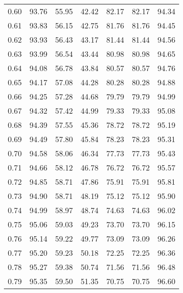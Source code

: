 \begin{tabular}{|c|c|c|c|c|c|c|}
      0.60 &     93.76 &     55.95 &      42.42 &   82.17 &      82.17 &         94.34 \\
      0.61 &     93.83 &     56.15 &      42.75 &   81.76 &      81.76 &         94.45 \\
      0.62 &     93.93 &     56.43 &      43.17 &   81.44 &      81.44 &         94.56 \\
      0.63 &     93.99 &     56.54 &      43.44 &   80.98 &      80.98 &         94.65 \\
      0.64 &     94.08 &     56.78 &      43.84 &   80.57 &      80.57 &         94.76 \\
      0.65 &     94.17 &     57.08 &      44.28 &   80.28 &      80.28 &         94.88 \\
      0.66 &     94.25 &     57.28 &      44.68 &   79.79 &      79.79 &         94.99 \\
      0.67 &     94.32 &     57.42 &      44.99 &   79.33 &      79.33 &         95.08 \\
      0.68 &     94.39 &     57.55 &      45.36 &   78.72 &      78.72 &         95.19 \\
      0.69 &     94.49 &     57.80 &      45.84 &   78.23 &      78.23 &         95.31 \\
      0.70 &     94.58 &     58.06 &      46.34 &   77.73 &      77.73 &         95.43 \\
      0.71 &     94.66 &     58.12 &      46.78 &   76.72 &      76.72 &         95.57 \\
      0.72 &     94.85 &     58.71 &      47.86 &   75.91 &      75.91 &         95.81 \\
      0.73 &     94.90 &     58.71 &      48.19 &   75.12 &      75.12 &         95.90 \\
      0.74 &     94.99 &     58.97 &      48.74 &   74.63 &      74.63 &         96.02 \\
      0.75 &     95.06 &     59.03 &      49.23 &   73.70 &      73.70 &         96.15 \\
      0.76 &     95.14 &     59.22 &      49.77 &   73.09 &      73.09 &         96.26 \\
      0.77 &     95.20 &     59.23 &      50.18 &   72.25 &      72.25 &         96.36 \\
      0.78 &     95.27 &     59.38 &      50.74 &   71.56 &      71.56 &         96.48 \\
      0.79 &     95.35 &     59.50 &      51.35 &   70.75 &      70.75 &         96.60 \\

\end{tabular}
